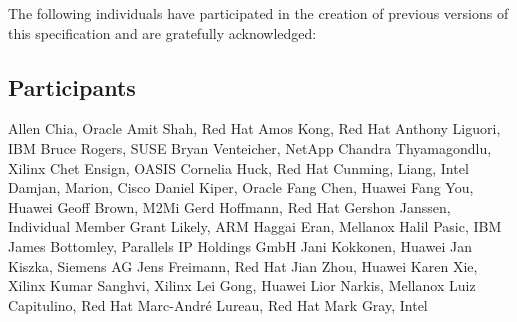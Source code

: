 The following individuals have participated in the creation of
previous versions of this specification and are gratefully acknowledged:

\subsection*{Participants}
Allen Chia, Oracle	\newline
Amit Shah,	Red Hat	\newline
Amos Kong,	Red Hat	\newline
Anthony Liguori,	IBM	\newline
Bruce Rogers, SUSE	\newline
Bryan Venteicher,	NetApp	\newline
Chandra Thyamagondlu, Xilinx	\newline
Chet Ensign, OASIS	\newline
Cornelia Huck,	Red Hat	\newline
Cunming, Liang, Intel	\newline
Damjan, Marion, Cisco	\newline
Daniel Kiper,	Oracle	\newline
Fang Chen, Huawei	\newline
Fang You, Huawei	\newline
Geoff Brown,	M2Mi	\newline
Gerd Hoffmann, Red Hat	\newline
Gershon Janssen,	Individual Member	\newline
Grant Likely, ARM	\newline
Haggai Eran,	Mellanox	\newline
Halil Pasic,	IBM	\newline
James Bottomley,	Parallels IP Holdings GmbH	\newline
Jani Kokkonen, Huawei	\newline
Jan Kiszka,	Siemens AG	\newline
Jens Freimann, Red Hat	\newline
Jian Zhou,	Huawei	\newline
Karen Xie, Xilinx	\newline
Kumar Sanghvi, Xilinx	\newline
Lei Gong,	Huawei	\newline
Lior Narkis,	Mellanox	\newline
Luiz Capitulino,	Red Hat	\newline
Marc-André Lureau, Red Hat	\newline
Mark Gray, Intel	\newline
